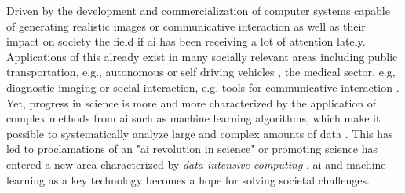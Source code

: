  
Driven by the development and commercialization of computer systems capable of generating realistic images or communicative interaction as well as their impact on society \cite{lin2023} the field if \gls{ai} has been receiving a lot of attention lately. Applications of this already exist in many socially relevant areas including public transportation, e.g., autonomous or self driving vehicles \cite{Leonard2020}, the medical sector, e.g, diagnostic imaging \cite{Liu2020} or social interaction, e.g. tools for communicative interaction \cite{Adamopoulou2020}. Yet, progress in science is more and more characterized by the application of complex methods from \gls{ai} such as machine learning algorithms, which make it possible to systematically analyze large and complex amounts of data \cite{Brunton2019}. This has led to proclamations of an "\gls{ai} revolution in science" \cite{Appenzeller2017} or promoting science has entered a new area characterized by \textit{data-intensive computing} \cite{Hey2009}. \Gls{ai} and machine learning as a key technology becomes a hope for solving societal challenges.\\
